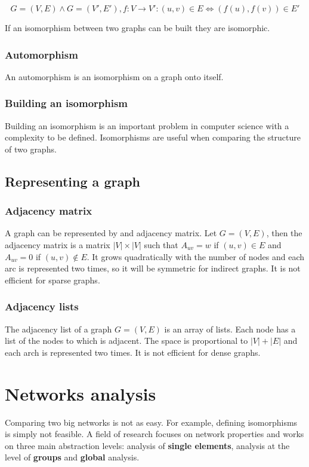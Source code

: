 	$$G = (V,E)\land G = (V',E'), f:V \rightarrow V': (u, v)\in E\Leftrightarrow (f(u), f(v))\in E'$$

	If an isomorphism between two graphs can be built they are isomorphic.

		\subsubsection{Automorphism}
		An automorphism is an isomorphism on a graph onto itself.

		\subsubsection{Building an isomorphism}
		Building an isomorphism is an important problem in computer science with a complexity to be defined.
		Isomorphisms are useful when comparing the structure of two graphs.

	\subsection{Representing a graph}

		\subsubsection{Adjacency matrix}
		A graph can be represented by and adjacency matrix.
		Let $G = (V,E)$, then the adjacency matrix is a matrix $|V|\times|V|$ such that $A_{uv} = w$ if $(u,v)\in E$ and $A_{uv} = 0$ if $(u,v)\not\in E$.
		It grows quadratically with the number of nodes and each arc is represented two times, so it will be symmetric for indirect graphs.
		It is not efficient for sparse graphs.

		\subsubsection{Adjacency lists}
		The adjacency list of a graph $G=(V,E)$ is an array of lists.
		Each node has a list of the nodes to which is adjacent.
		The space is proportional to $|V|+|E|$ and each arch is represented two times.
		It is not efficient for dense graphs.

\section{Networks analysis}
Comparing two big networks is not as easy. For example, defining isomorphisms is simply not feasible.
A field of research focuses on network properties and works on three main abstraction levels: analysis of \textbf{single elements}, analysis at the level of \textbf{groups} and \textbf{global} analysis.

